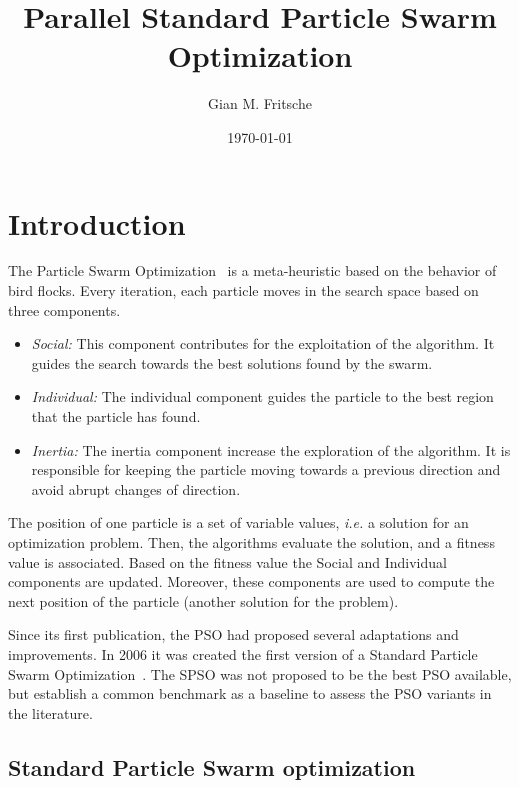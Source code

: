 \documentclass{article}
\title{Parallel Standard Particle Swarm Optimization}
\author{Gian M. Fritsche}
\date{\today}
\begin{document}
    \maketitle

    \section{Introduction}

    The Particle Swarm Optimization~\cite{PSO95} is a meta-heuristic based on the behavior of bird flocks. Every iteration, each particle moves in the search space based on three components.

    \begin{itemize}
        \item {\em Social:} This component contributes for the exploitation of the algorithm.
        It guides the search towards the best solutions found by the swarm.
        \item {\em Individual:} The individual component guides the particle to the best region that the particle has found.
        \item {\em Inertia:} The inertia component increase the exploration of the algorithm. It is responsible for keeping the particle moving towards a previous direction and avoid abrupt changes of direction.
    \end{itemize}

    The position of one particle is a set of variable values, {\em i.e.} a solution for an optimization problem. Then, the algorithms evaluate the solution, and a fitness value is associated. Based on the fitness value the Social and Individual components are updated.
    Moreover, these components are used to compute the next position of the particle (another solution for the problem).

    Since its first publication, the PSO had proposed several adaptations and improvements.
    In 2006 it was created the first version of a Standard Particle Swarm Optimization~\cite{SPSO}. The SPSO was not proposed to be the best PSO available, but establish a common benchmark as a baseline to assess the PSO variants in the literature.

    \subsection {Standard Particle Swarm optimization}
\end{document}
